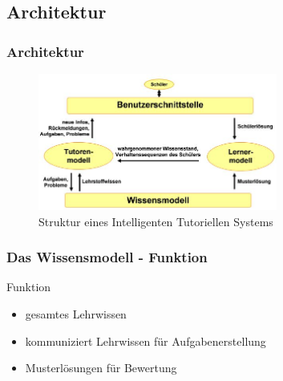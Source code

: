 \documentclass{beamer}
\begin{document}
\subsection{Architektur}
\begin{frame}
  \frametitle{Architektur}
    \begin{figure}[!htb]
    	\centering
        \includegraphics[width=0.7\textwidth]{../bilder/its_structure.jpg} %
    	\caption{Struktur eines Intelligenten Tutoriellen Systems}
    \end{figure}
\end{frame}

\begin{frame}
  \frametitle{Das Wissensmodell - Funktion}
  \begin{block}{Funktion}
    \begin{itemize}
      \item gesamtes Lehrwissen
      \item kommuniziert Lehrwissen für Aufgabenerstellung
      \item Musterlösungen für Bewertung
    \end{itemize}
  \end{block}
\end{frame}
\end{document}
